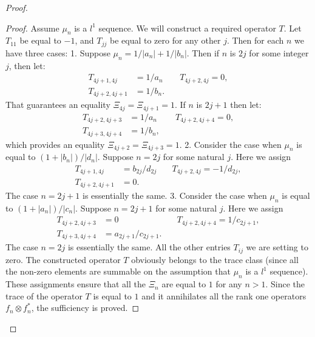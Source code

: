 \documentclass[12pt]{article}
\theoremstyle{definition}
\numberwithin{remark}{section}
\numberwithin{theorem}{section}
\numberwithin{prop}{section}
\numberwithin{equation}{section}
\numberwithin{lemma}{section}
\numberwithin{prop_under_lemma}{lemma}
\begin{document}
\begin{proof}
        \begin{proof}
            Assume $\mu_n$ is a $l^1$ sequence. We will construct a required operator $T$.
            Let $T_{11}$ be equal to $-1$, and $T_{jj}$ be equal to zero for any other $j$.
            Then for each $n$ we have three cases:
            1. Suppose $\mu_n = 1/|a_n| + 1/|b_n|$. Then if $n$ is $2j$ for some integer $j$, then
            let:
            \begin{align*}
                T_{4j+1,4j}&=1/a_n & \quad T_{4j+2,4j} = 0,\\
                T_{4j+2,4j+1}&=1/b_n.
            \end{align*}
            That guarantees an equality $\Xi_{4j} = \Xi_{4j+1} = 1$.
            If $n$ is $2j+1$ then let:
            \begin{align*}
                T_{4j+2,4j+3}&=1/a_n & \quad T_{4j+2,4j+4} = 0,\\
                T_{4j+3,4j+4}&=1/b_n,
            \end{align*}
            which provides an equality $\Xi_{4j+2} = \Xi_{4j+3} = 1$.
            2. Consider the case when $\mu_n$ is equal to $(1 + |b_n|)/|d_n|$. 
            Suppose $n = 2j$ for some natural $j$.
            Here we assign
            \begin{align*}
                T_{4j+1,4j} &= b_{2j}/d_{2j} & \quad T_{4j+2,4j} = -1/d_{2j},\\
                T_{4j+2,4j+1} &= 0.
            \end{align*}
            The case $n = 2j + 1$ is essentially the same.
            3. Consider the case when $\mu_n$ is equal to $(1 + |a_n|)/|c_n|$. 
            Suppose $n = 2j + 1$ for some natural $j$.
            Here we assign
            \begin{align*}
                T_{4j+2,4j+3} &= 0 & \quad T_{4j+2,4j+4} = 1/c_{2j+1},\\
                T_{4j+3,4j+4} &= a_{2j+1}/c_{2j+1}.
            \end{align*}
            The case $n = 2j$ is essentially the same.
            All the other entries $T_{ij}$ we are setting to zero.
            The constructed operator $T$ obviously belongs to the trace class (since all the non-zero elements are summable 
            on the assumption that $\mu_n$ is a $l^1$ sequence).
            These assignments ensure that all the $\Xi_n$ are equal to $1$ for any $n > 1$.
            Since the trace of the operator $T$ is equal to
            $1$ and it annihilates all the rank one operators $f_n \otimes f^*_n$, the sufficiency is proved.

\end{proof}
\end{proof}
\end{document}
